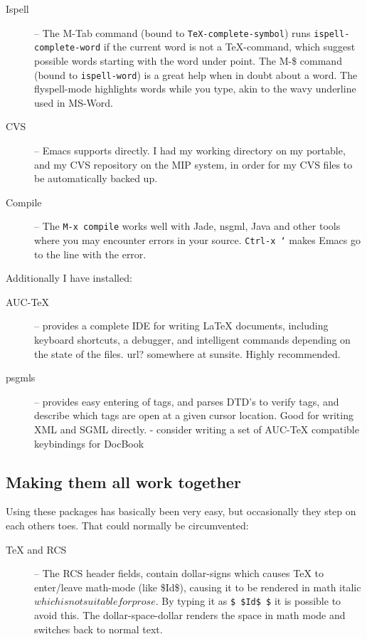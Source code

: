 \begin{description}
\item[Ispell] -- The M-Tab command (bound to
  \texttt{TeX-complete-symbol}) runs \texttt{ispell-complete-word} if
  the current word is not a {\TeX}-command, which suggest possible
  words starting with the word under point.  The M-\$ command (bound
  to \texttt{ispell-word}) is a great help when in doubt about a
  word.  The \textsf{flyspell-mode} highlights words while you type,
  akin to the wavy underline used in MS-Word. 

\item[CVS] -- Emacs supports  directly.  I
  had my working directory on my portable, and my CVS repository on
  the MIP system, in order for my CVS files to be automatically backed
  up. 
\item[Compile] -- The \texttt{M-x compile} works well with Jade,
  nsgml, Java and other tools where you may encounter errors in your
  source.  \texttt{Ctrl-x `} makes Emacs go to the line with the
  error.
  
\end{description}

Additionally I have installed:


\begin{description}
\item[AUC-TeX] -- provides a complete IDE for writing {\LaTeX}
  documents, including keyboard shortcuts, a debugger, and intelligent
  commands depending on the state of the files.  \textsf{url?
    somewhere at sunsite}.  Highly recommended.
\item[psgmls] -- provides easy entering of tags, and parses DTD's to
  verify tags, and describe which tags are open at a given cursor
  location.   Good for writing XML and SGML directly.
   - \textsf{consider writing a set of AUC-TeX
    compatible keybindings for DocBook}
\end{description}



\subsection{Making them all work together}
\label{sec:making-them-all-work-together}

Using these packages has basically been very easy, but occasionally
they step on each others toes.  That could normally be circumvented:

\begin{description}
\item[{\TeX} and RCS] -- The RCS header fields, contain dollar-signs
  which causes {\TeX} to enter/leave math-mode (like
  \mbox{\$I}\mbox{d\$}), causing it to be rendered in math italic
  $which is not suitable for prose$.  By typing it as \texttt{\$
    \${}Id\$ \$} it is possible to avoid this. The dollar-space-dollar
  renders the space in math mode and switches back to normal text.


\end{description}

